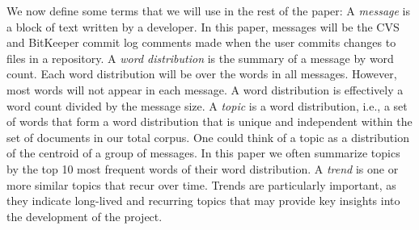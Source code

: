 \documentclass[times, 10pt,twocolumn]{article}
\newcommand{\shrinkit}{\vspace*{-.3em}}
\begin{document}
\shrinkit
{}
\shrinkit

We now define some terms that we will use in the rest of the paper: A
\emph{message} is a block of text written by a developer. In this
paper, messages will be the CVS and BitKeeper commit log comments made
when the user commits changes to files in a repository. A \emph{word
  distribution} is the summary of a message by word count. Each word
distribution will be over the words in all messages. However, most
words will not appear in each message. A word distribution is effectively
a word count divided by the message size. A \emph{topic} is a word
distribution, i.e., a set of words that form a word distribution that is
unique and independent within the set of documents in our total
corpus. One could think of a topic as a distribution of the centroid
of a group of messages. In this paper we often summarize topics by the
top 10 most frequent words of their word distribution.  A \emph{trend}
is one or more similar topics that recur over time.  Trends are
particularly important, as they indicate long-lived and recurring
topics that may provide key insights into the development of the
project.
\end{document}
